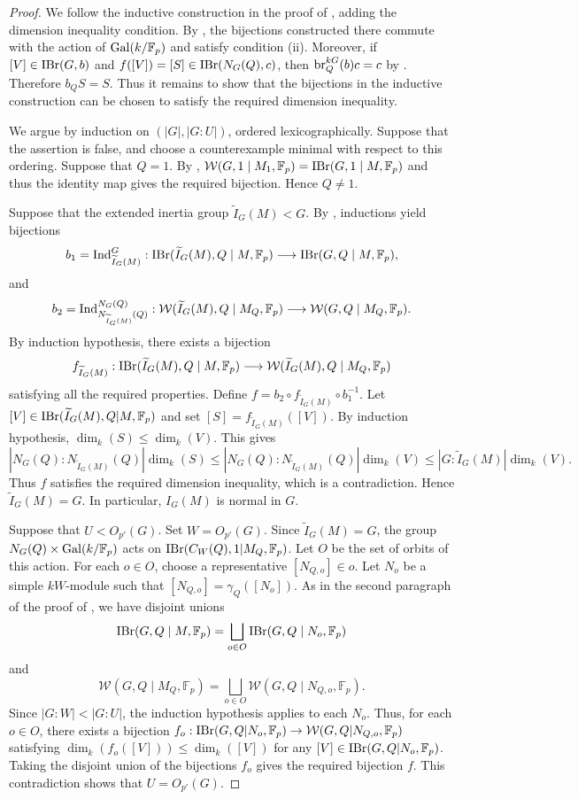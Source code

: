 \documentclass[preprint,12pt,3p]{elsarticle}
\def\IBr{{\rm IBr}}
\def\Ind{{\rm Ind}}
\def\br{{\rm br}}
\def\Gal{{\rm Gal}}
\def\W{\mathcal{W}}
\def\F{\mathbb{F}}
\begin{document}
\begin{proof}
We follow the inductive construction in the proof of
\cite[Theorem 7.1]{Turull14}, adding the dimension inequality
condition.
By \cite[Theorem 7.1 and \S 2(2")]{Turull14},
the bijections constructed there commute with the
action of $\Gal(k/\F_p)$ and satisfy
condition (ii).
Moreover, if $[V]\in\IBr(G,b)$ and
$f([V])=[S]\in\IBr(N_G(Q),c)$, then
$\br_Q^{kG}(b)c=c$ by \cite[Theorem 7.1(1)]{Turull14}.
Therefore $b_QS=S$.
Thus it remains to show that the bijections in
the inductive construction can be chosen to
satisfy the required dimension inequality.

We argue by induction on $(|G|,|G:U|)$,
ordered lexicographically.
Suppose that the assertion is false, and
choose a counterexample minimal with respect
to this ordering.
Suppose that $Q=1$.
By \cite[Proposition 5.8]{Turull14}, $\W(G,1\mid M_1,\F_p) = \IBr(G,1 \mid M,\F_p)$ and thus the identity map gives the
required bijection.
Hence $Q\neq1$.

Suppose that the extended inertia group $\widetilde{I}_G(M) < G$.
By \cite[Propositions 5.9 and 5.10]{Turull14},
inductions yield bijections
\[
b_1 = \Ind_{\widetilde{I}_G(M)}^G:\IBr(\widetilde{I}_G(M),Q\mid M,\F_p) \longrightarrow \IBr(G,Q\mid M,\F_p),
\]
and
\[
b_2 = \Ind_{N_{\widetilde{I}_G(M)}(Q)}^{N_G(Q)}:\W(\widetilde{I}_G(M),Q\mid M_Q,\F_p)
\longrightarrow
\W(G,Q\mid M_Q,\F_p).
\]
By induction hypothesis, there exists a bijection
\[
f_{\widetilde{I}_G(M)}:\IBr(\widetilde{I}_G(M),Q\mid M,\F_p)
\longrightarrow
\W(\widetilde{I}_G(M),Q\mid M_Q,\F_p)
\]
satisfying all the required properties.
Define
$f=b_2\circ f_{\widetilde{I}_G(M)}\circ b_1^{-1}$.
Let $[V]\in\IBr(\widetilde{I}_G(M),Q | M,\F_p)$
and set $[S]=f_{\widetilde{I}_G(M)}([V])$.
By induction hypothesis,
$\dim_k(S)\leq\dim_k(V)$.
This gives
\[
|N_G(Q):N_{\widetilde{I}_G(M)}(Q)|\dim_k(S)
\leq
|N_G(Q):N_{\widetilde{I}_G(M)}(Q)|\dim_k(V)
\leq
|G:\widetilde{I}_G(M)|\dim_k(V).
\]
Thus $f$ satisfies the required dimension inequality, which is a contradiction.
Hence
$\widetilde{I}_G(M) = G$.
In particular, $I_G(M)$ is normal in $G$.

Suppose that $U<O_{p'}(G)$.
Set
$W=O_{p'}(G)$.
Since $\widetilde{I}_G(M) = G$, the group $N_G(Q) \times \Gal(k/\F_p)$ acts on $\IBr(C_W(Q), 1 | M_Q , \F_p)$.
Let $O$ be the set of orbits of this action.
For each $o \in O$, choose a
representative $[N_{Q,o}]\in o$.
Let $N_o$ be a simple $k W$-module such that $[N_{Q,o}] = \gamma_Q ([N_o])$.
As in the second paragraph of the proof of \cite[Theorem 7.1]{Turull14},
we have disjoint unions
\[
\IBr(G,Q \mid M , \F_p) = \bigsqcup_{o \in O} \IBr(G,Q \mid N_o , \F_p)
\]
and
\[
\W(G,Q \mid M_Q , \F_p) = \bigsqcup_{o \in O} \W(G,Q \mid N_{Q,o}, \F_p).
\]
Since $|G:W|<|G:U|$,
the induction hypothesis applies to
each $N_o$. Thus, for each
$o\in O$, there exists a bijection
$f_o:
\IBr(G,Q | N_o,\F_p)
\to
\W(G,Q | N_{Q,o},\F_p)$
satisfying
$\dim_k(f_o([V]))
\leq\dim_k([V])$ for any $[V] \in \IBr(G,Q | N_o,\F_p)$.
Taking the disjoint union of the
bijections $f_o$ gives the required
bijection $f$.
This contradiction shows that
$U=O_{p'}(G)$.


\end{proof}
\end{document}
